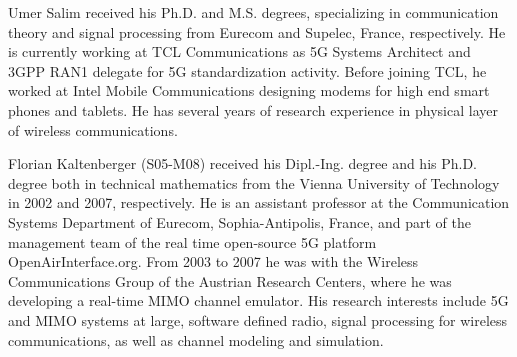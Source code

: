 \documentclass{ieeeaccess}
\begin{document}
\begin{IEEEbiography}{Umer Salim} received his Ph.D. and M.S. degrees, specializing in communication theory and signal processing from Eurecom and Supelec, France, respectively. He is currently working at TCL Communications as 5G Systems Architect and 3GPP RAN1 delegate for 5G standardization activity. Before joining TCL, he worked at Intel Mobile Communications designing modems for high end smart phones and tablets. He has several years of research experience in physical layer of wireless communications.
\end{IEEEbiography}

\begin{IEEEbiography}{Florian Kaltenberger} (S05-M08) received his Dipl.-Ing. degree and his Ph.D. degree both in technical mathematics from the Vienna University of Technology in 2002 and 2007, respectively. He is an assistant professor at the Communication Systems Department of Eurecom, Sophia-Antipolis, France, and part of the management team of the real time open-source 5G platform OpenAirInterface.org. From 2003 to 2007 he was with the Wireless Communications Group of the Austrian Research Centers, where he was developing a real-time MIMO channel emulator. His research interests include 5G and MIMO systems at large, software defined radio, signal processing for wireless communications, as well as channel modeling and simulation.
\end{IEEEbiography}

\EOD
\end{document}
